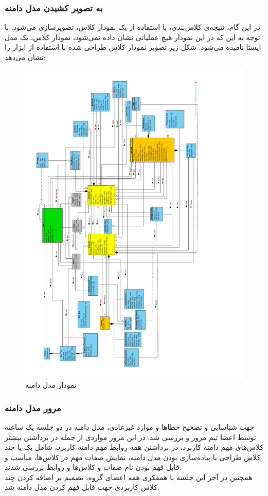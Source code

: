 \documentclass[12pt]{article}
\begin{document}
	\subsubsection{به تصویر کشیدن مدل دامنه}
	در این گام، نتیجه‌ی کلاس‌بندی، با استفاده از یک نمودار کلاس، تصویرسازی می‌شود. با توجه به این که در این نمودار هیچ عملیاتی نشان داده نمی‌شود، نمودار کلاس، یک مدل ایستا نامیده می‌شود. شکل زیر تصویر نمودار کلاس طراحی شده با استفاده از ابزار
	را نشان می‌دهد:
	\begin{figure}
		\centering
		\includegraphics[width=1.2\textwidth, height=0.9\textheight]{files/Project_OOAD_Phase2_DiagramClass_V5_rotated}
		\caption{نمودار مدل دامنه}
		\label{fig:classdiagram}
	\end{figure}

	\newpage
	\subsubsection{مرور مدل دامنه}
	جهت شناسایی و تصحیح خطاها و موارد غیرعادی، مدل دامنه در دو جلسه یک ساعته توسط اعضا تیم مرور و بررسی شد. در این مرور مواردی از جمله در برداشتن بیشتر کلاس‌های مهم دامنه کاربرد، در برداشتن همه‌ روابط مهم دامنه کاربرد، شامل یک یا چند کلاس طراحی یا پیاده‌سازی بودن مدل دامنه، نمایش صفات مهم در کلاس‌ها، مناسب و قابل فهم بودن نام صفات و کلاس‌ها و روابط بررسی شدند.\\
	همچنین در آخر این جلسه با همفکری همه اعضای گروه، تصمیم بر اضافه کردن چند کلاس کاربردی جهت قابل فهم کردن مدل دامنه شد.
\end{document}
